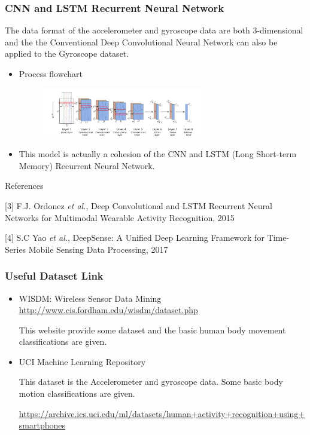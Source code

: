 \documentclass{beamer} %
\begin{document}
\begin{frame}
\frametitle{CNN and LSTM Recurrent Neural Network}

The data format of the accelerometer and gyroscope data are both 3-dimensional and the the Conventional Deep Convolutional Neural Network can also be applied to the Gyroscope dataset.

\begin{itemize}
\item Process flowchart

 \begin{figure}[htbp] 
	
	\begin{center}
		\includegraphics[width=7cm]{./image/g1} 	
	\end{center}
\end{figure}

\item This model is actually a cohesion of the CNN and LSTM (Long Short-term Memory) Recurrent Neural Network. 
\end{itemize}

\scriptsize References

\tiny [3] F.J. Ordonez \textit{et al.}, Deep Convolutional and LSTM Recurrent Neural Networks for Multimodal Wearable Activity Recognition, 2015

\tiny [4] S.C Yao \textit{et al.}, DeepSense: A Unified Deep Learning Framework for Time-Series Mobile Sensing Data Processing, 2017


\end{frame}

\begin{frame}
\frametitle{Useful Dataset Link}

\begin{itemize}
\item WISDM: Wireless Sensor Data Mining
\url{http://www.cis.fordham.edu/wisdm/dataset.php}

This website provide some dataset and the basic human body movement classifications are given. 

\item UCI Machine Learning Repository

This dataset is the Accelerometer and gyroscope data. Some basic body motion classifications are given. 

\url{https://archive.ics.uci.edu/ml/datasets/human+activity+recognition+using+smartphones}

\end{itemize}
\end{frame}
\end{document}
